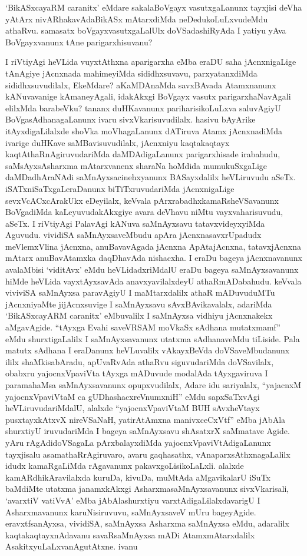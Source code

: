 \begin{artha}
`BikASxcayaRM caranitx' eMdare sakalaBoVgayx vasutxgaLanunx tayxjisi deVha yAtArx nivARhakavAdaBikASx mAtarxdiMda neDedukoLuLxvudeMdu athaRvu. samasatx boVgayxvasutxgaLalUlx doVSadashiRyAda I yatiyu yAva BoVgayxvanunx tAne parigarxhisuvanu?
\end{artha}

\begin{artha}
I riVtiyAgi heVLida vuyxtAthxna aparigarxha eMba eraDU saha jAcnxnigaLige tAnAgiye jAcnxnada mahimeyiMda sididhxsuvavu, parxyatanxdiMda sididhxsuvudilalx, EkeMdare? aKaMDAnaMda savxBAvada Atamxnanunx kANuvavanige kAmaneyAgali, idakAkxgi BoVgayx vasutx parigarxhaNavAgali elilxMda barabeVku? tananx duHKavanunx pariharisikoLuLxva saluvAgiyU BoVgasAdhanagaLanunx ivaru sivxVkarisuvudilalx. hasivu bAyArike itAyxdigaLilalxde shoVka moVhagaLanunx dATiruva Atamx jAcnxnadiMda ivarige duHKave saMBavisuvudilalx, jAcnxniyu kaqtakaqtayx kaqtAthaRnAgiruvudariMda daMDAdigaLanunx parigarxhisade irabahudu, saMsAyxsAsharxma mAtarxvanenx sharaNa hoMdida mumukuSxgaLige daMDadhAraNAdi saMnAyxsacinehxyanunx BASayxdalilx heVLiruvudu aSeTx. iSATxniSaTxgaLeraDanunx biTiTxruvudariMda jAcnxnigaLige sevxVcACxcArakUkx eDeyilalx, keVvala pArxrabadhxkamaRsheVSavanunx BoVgadiMda kaLeyuvudakAkxgiye avara deVhavu niMtu vayxvaharisuvudu, aSeTx. I riVtiyAgi PalavAgi kANuva saMnAyxsavu tatavxvideyxyiMda Aguvudu. vividiSA saMnAyxsaveMbudu apAra jAcnxnasavxrUpadudx meVlemxVlina jAcnxna, anuBavavAgada jAcnxna ApAtajAcnxna, tatavxjAcnxna mAtarx anuBavAtamxka daqDhavAda nishacxha. I eraDu bageya jAcnxnavanunx avalaMbisi `viditAvx' eMdu heVLidadxriMdalU eraDu bageya saMnAyxsavanunx hiMde heVLida vayxtAyxsavAda anavxyavilalxdeyU athaRmADabahudu. keVvala viviviSA saMnAyxsa paravAgiyU I maMtarxdalilx athaR mADuvuduMTu \mdash  jAcnxniyaMte jijAcnxsuvige I saMnAyxsavu sAvxBAvikavalalx, adariMda `BikASxcayARM caranitx' eMbuvalilx I saMnAyxsa vidhiyu jAcnxnakekx aMgavAgide. ``tAyxga Evahi saveVRSAM moVkaSx sAdhana mutatxmamf'' eMdu shurxtigaLalilx I saMnAyxsavanunx utatxma sAdhanaveMdu tiLiside. Pala matutx sAdhana I eraDanunx heVLuvalilx vAkayxBeVda doVSaveMbudanunx ililx shaMkisabAradu, apUvaRvAda athaRvu siguvudariMda doVSavilalx, obabxru yajocnxVpaviVta tAyxga mADuvude modalAda tAyxgaviruva I paramahaMsa saMnAyxsavanunx opupxvudilalx, Adare idu sariyalalx, ``yajacnxM yajocnxVpaviVtaM ca gUDhashacxreVnumxniH'' eMdu sapxSaTxvAgi heVLiruvudariMdalU, alalxde ``yajocnxVpaviVtaM BUH sAvxheVtayx pusxtayxkAtxvX nireVSaNaH, yatirAtAmxna manivxceCxVtf'' eMba jAbAla shurxtiyU iruvudariMda I bageya saMnAyxsavu shAsatxrX saMmatave Agide. yAru rAgAdidoVSagaLa pArxbalayxdiMda yajocnxVpaviVtAdigaLanunx tayxjisalu asamathaRrAgiruvaro, avaru gaqhasathx, vAnaparxsAthxnagaLalilx idudx kamaRgaLiMda rAgavanunx pakavxgoLisikoLaLxli. alalxde kamARdhikAravilalxda kuruDa, kivuDa, muMtAda aMgavikalarU iSuTx baMdiMte utatxma janamxkAkxgi AsharxmasaMnAyxsavanunx sivxVkarisali, `avarxtiV vatiVvA' eMba jAbAlashurxtiyu varxtAdigaLilalxdavarigU I Asharxmavanunx karuNisiruvuvu, saMnAyxsaveV mUru bageyAgide. eravxtfsanAyxsa, vividiSA, saMnAyxsa Asharxma saMnAyxsa eMdu, adaralilx kaqtakaqtayxnAdavanu savaRsaMnAyxsa mADi AtamxmAtarxdalilx AsakitxyuLaLxvanAgutAtxne. ivanu 
\end{artha}
